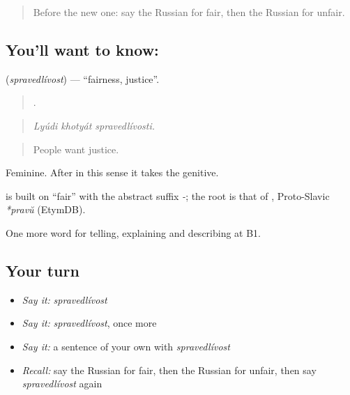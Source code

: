 \label{lesson:RU-C345-spravedlivost}



\begin{quote}
Before the new one: say the Russian for fair, then the Russian for unfair.
\end{quote}

\subsection*{You'll want to know: }
\textbf{} (\emph{spravedlívost}) — \textquotedblleft{}fairness, justice\textquotedblright{}.

\begin{quote}
  .
\end{quote}

\begin{quote}
\emph{Lyúdi khotyát spravedlívosti.}
\end{quote}

\begin{quote}
People want justice.
\end{quote}

Feminine. After \emph{} in this sense it takes the genitive.

\begin{cousinweb}
\textbf{} is built on \emph{} \textquotedblleft{}fair\textquotedblright{} with the abstract suffix \emph{-}; the root is that of \emph{}, Proto-Slavic \emph{*pravŭ} (EtymDB).
\end{cousinweb}

\begin{grammarlens}[title={What you've built}]
One more word for telling, explaining and describing at B1.
\end{grammarlens}

\subsection*{Your turn}
\begin{itemize}
\raggedright
  \item \emph{Say it:} \emph{spravedlívost}
  \item \emph{Say it:} \emph{spravedlívost}, once more
  \item \emph{Say it:} a sentence of your own with \emph{spravedlívost}
  \item \emph{Recall:} say the Russian for fair, then the Russian for unfair, then say \emph{spravedlívost} again
\end{itemize}

